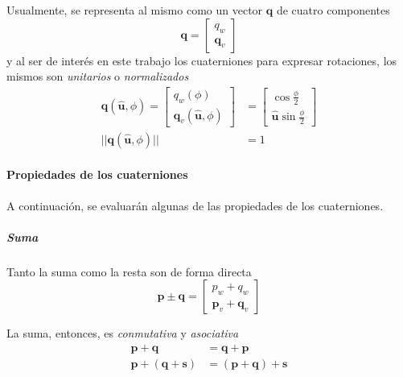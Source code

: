 Usualmente, se representa al mismo como un vector $\bm{q}$ de cuatro componentes
\begin{equation}
    \bm{q} =
    \begin{bmatrix}
    q_w \\
    \bm{q}_v
    \end{bmatrix}
\end{equation}
y al ser de interés en este trabajo los cuaterniones para expresar rotaciones, los mismos son \textit{unitarios} o \textit{normalizados}
\begin{align}
    \bm{q}(\hat{\bm{u}},\phi) =
    \begin{bmatrix}
    q_w(\phi) \\
    \bm{q}_v(\hat{\bm{u}},\phi)
    \end{bmatrix}
    &=
    \begin{bmatrix}
        \cos{\frac{\phi}{2}} \\
        \hat{\bm{u}}\sin{\frac{\phi}{2}}
    \end{bmatrix}
    \\
    ||\bm{q}(\hat{\bm{u}},\phi)|| &= 1
\end{align}


\paragraph{Propiedades de los cuaterniones}
A continuación, se evaluarán algunas de las propiedades de los cuaterniones.
\subparagraph{Suma}
Tanto la suma como la resta son de forma directa
\begin{equation}
    \bm{p} \pm \bm{q} =
    \begin{bmatrix}
        p_w + q_w \\
        \bm{p}_v + \bm{q}_v
    \end{bmatrix}
\end{equation}

La suma, entonces, es \textit{conmutativa} y \textit{asociativa}
\begin{align}
    \bm{p} + \bm{q} &= \bm{q} + \bm{p} \\
    \bm{p} + (\bm{q} + \bm{s}) &= (\bm{p} + \bm{q}) + \bm{s}
\end{align}

